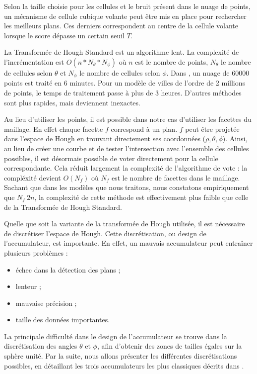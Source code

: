 ﻿\documentclass[12pt, twoside]{article}
\begin{document}
Selon la taille choisie pour les cellules et le bruit présent dans le nuage de points, un mécanisme de cellule cubique volante peut être mis en place pour rechercher les meilleurs plans. Ces derniers correspondent au centre de la cellule volante lorsque le score dépasse un certain seuil $T$.

La Transformée de Hough Standard est un algorithme lent. La complexité de l'incrémentation est $O(n*N_{\theta}*N_{\phi})$ où $n$ est le nombre de points, $N_{\theta}$ le nombre de cellules selon $\theta$ et $N_{\phi}$ le nombre de cellules selon $\phi$. Dans \cite{Hough1}, un nuage de 60000 points est traité en 6 minutes. Pour un modèle de villes de l'ordre de 2 millions de points, le temps de traitement passe à plus de 3 heures. D'autres méthodes sont plus rapides, mais deviennent inexactes.

Au lieu d'utiliser les points, il est possible dans notre cas d'utiliser les facettes du maillage. En effet chaque facette $f$ correspond à un plan. $f$ peut être projetée dans l'espace de Hough en trouvant directement ses coordonnées ($\rho, \theta, \phi$). Ainsi, au lieu de créer une courbe et de tester l'intersection avec l'ensemble des cellules possibles, il est désormais possible de voter directement pour la cellule correspondante. Cela réduit largement la complexité de l'algorithme de vote : la compléxité devient $O(N_f)$ où $N_f$ est le nombre de facettes dans le maillage. Sachant que dans les modèles que nous traitons, nous constatons empiriquement que $N_f ~ 2n$, la complexité de cette méthode est effectivement plus faible que celle de la Transformée de Hough Standard.

Quelle que soit la variante de la transformée de Hough utilisée, il est nécessaire de discrétiser l'espace de Hough. Cette discrétisation, ou design de l'accumulateur, est importante. En effet, un mauvais accumulateur peut entraîner plusieurs problèmes :
\begin{itemize}
  \item échec dans la détection des plans ;
  \item lenteur ;
  \item mauvaise précision ;
  \item taille des données importantes.
\end{itemize}
La principale difficulté dans le design de l'accumulateur se trouve dans la discrétisation des angles $\theta$ et $\phi$, afin d'obtenir des zones de tailles égales sur la sphère unité. Par la suite, nous allons présenter les différentes discrétisations possibles, en détaillant les trois accumulateurs les plus classiques décrits dans \cite{Hough2}.
\end{document}
